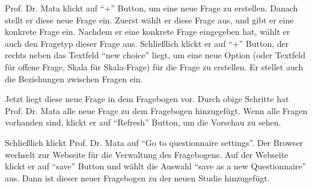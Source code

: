 \documentclass[a4paper]{scrreprt}
\begin{document}
                \par Prof. Dr. Mata klickt auf ``+'' Button, um eine neue Frage zu erstellen. Danach stellt er diese neue Frage ein. Zuerst wählt er diese Frage aus, und gibt er eine konkrete Frage ein. Nachdem er eine konkrete Frage eingegeben hat, wählt er auch den Fragetyp dieser Frage aus. Schließlich klickt er auf ``+'' Button, der rechts neben das Textfeld ``new choice'' liegt, um eine neue Option (oder Textfeld für offene Frage, Skala für Skala-Frage) für die Frage zu erstellen. Er stellet auch die Beziehungen zwischen Fragen ein.
                
                \par Jetzt liegt diese neue Frage in dem Fragebogen vor. Durch obige Schritte hat Prof. Dr. Mata alle neue Frage zu dem Fragebogen hinzugefügt. Wenn alle Fragen vorhanden sind, klickt er auf ``Refresh'' Button, um die Vorschau zu sehen.
                
                \par Schließlich klickt Prof. Dr. Mata auf ``Go to questionnaire settings''. Der Browser wechselt zur Webseite für die Verwaltung des Fragebogens. Auf der Webseite klickt er auf ``save'' Button und wählt die Auswahl ``save as a new Questionnaire'' aus. Dann ist dieser neuer Fragebogen zu der neuen Studie hinzugefügt.

        \newpage
\end{document}
